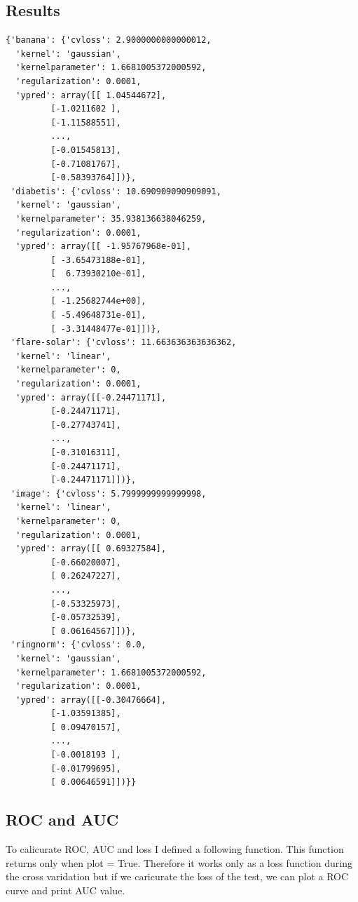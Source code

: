 \documentclass[a4paper,11pt]{article}
\begin{document}
\subsection*{Results}


\begin{verbatim}
{'banana': {'cvloss': 2.9000000000000012,
  'kernel': 'gaussian',
  'kernelparameter': 1.6681005372000592,
  'regularization': 0.0001,
  'ypred': array([[ 1.04544672],
         [-1.0211602 ],
         [-1.11588551],
         ..., 
         [-0.01545813],
         [-0.71081767],
         [-0.58393764]])},
 'diabetis': {'cvloss': 10.690909090909091,
  'kernel': 'gaussian',
  'kernelparameter': 35.938136638046259,
  'regularization': 0.0001,
  'ypred': array([[ -1.95767968e-01],
         [ -3.65473188e-01],
         [  6.73930210e-01],
         ..., 
         [ -1.25682744e+00],
         [ -5.49648731e-01],
         [ -3.31448477e-01]])},
 'flare-solar': {'cvloss': 11.663636363636362,
  'kernel': 'linear',
  'kernelparameter': 0,
  'regularization': 0.0001,
  'ypred': array([[-0.24471171],
         [-0.24471171],
         [-0.27743741],
         ..., 
         [-0.31016311],
         [-0.24471171],
         [-0.24471171]])},
 'image': {'cvloss': 5.7999999999999998,
  'kernel': 'linear',
  'kernelparameter': 0,
  'regularization': 0.0001,
  'ypred': array([[ 0.69327584],
         [-0.66020007],
         [ 0.26247227],
         ..., 
         [-0.53325973],
         [-0.05732539],
         [ 0.06164567]])},
 'ringnorm': {'cvloss': 0.0,
  'kernel': 'gaussian',
  'kernelparameter': 1.6681005372000592,
  'regularization': 0.0001,
  'ypred': array([[-0.30476664],
         [-1.03591385],
         [ 0.09470157],
         ..., 
         [-0.0018193 ],
         [-0.01799695],
         [ 0.00646591]])}}
\end{verbatim}



\subsection*{ROC and AUC}

To calicurate ROC, AUC and loss I defined a following function. This function returns only when plot = True. Therefore it works only as a loss function during the cross varidation but if we caricurate the loss of the test, we can plot a ROC curve and print AUC value.
\end{document}
